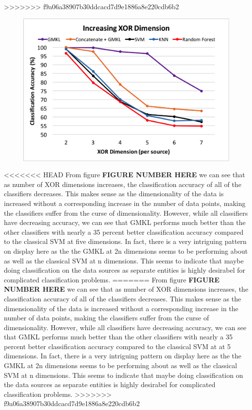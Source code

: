 \documentclass{article}
\begin{document}
>>>>>>> f9a06a38907b30ddcacd7d9e1886a8e220cdb6b2
\begin{figure}[h]
\begin{center}
\includegraphics[scale=0.4]{experimentpic1.png}
\end{center}
\end{figure}


<<<<<<< HEAD
From figure \textbf{FIGURE NUMBER HERE} we can see that as number of XOR
dimensions increases, the classification accuracy of all of the classifiers
decreases. This makes sense as the dimensionality of the data is increased
without a corresponding increase in the number of data points, making the
classifiers suffer from the curse of dimensionality. However, while all
classifiers have decreasing accuracy, we can see that GMKL performs much better
than the other classifiers with nearly a 35 percent better classification
accuracy compared to the classical SVM at five dimensions. In fact, there is a
very intriguing pattern on display here as the the GMKL at 2n dimensions seems
to be performing about as well as the classical SVM at n dimensions. This seems
to indicate that maybe doing classification on the data sources as separate
entities is highly desirabel for complicated classification problems.
=======
From figure \textbf{FIGURE NUMBER HERE}  we can see that as number of XOR dimensions increases, the classification accuracy of all of the classifiers decreases. This makes sense as the dimensionality of the data is increased without a corresponding increase in the number of data points, making the classifiers suffer from the curse of dimensionality. However, while all classifiers have decreasing accuracy, we can see that GMKL performs much better than the other classifiers with nearly a 35 percent better classification accuracy compared to the classical SVM at at 5 dimensions. In fact, there is a very intriguing pattern on display here as the the GMKL at 2n dimensions seems to be performing about as well as the classical SVM at n dimensions. This seems to indicate that maybe doing classification on the data sources as separate entities is highly desirabel for complicated classification problems. 
>>>>>>> f9a06a38907b30ddcacd7d9e1886a8e220cdb6b2
\end{document}
